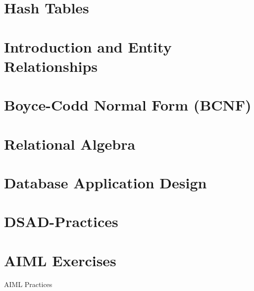 \documentclass[
  11pt,
  a4paper,
]{article}
\begin{document}
\section{Hash Tables}


\pagebreak


\section{Introduction and Entity Relationships}



\section{Boyce-Codd Normal Form (BCNF)}


\section{Relational Algebra}


\section{Database Application Design}


\section{DSAD-Practices}












\pagebreak




\pagebreak
\section{AIML Exercises}{AIML Practices}

\pagebreak


\end{document}
